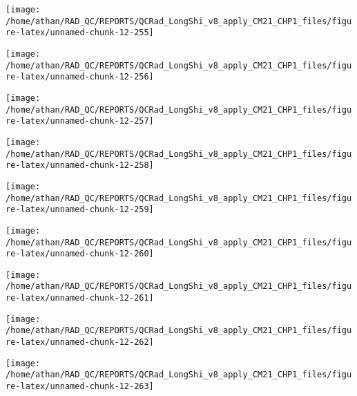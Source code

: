 \documentclass[
  10pt,
  a4paper,oneside]{article}
\begin{document}
\begin{center}\texttt{[image: /home/athan/RAD\_QC/REPORTS/QCRad\_LongShi\_v8\_apply\_CM21\_CHP1\_files/figure-latex/unnamed-chunk-12-255]} \end{center}

\begin{center}\texttt{[image: /home/athan/RAD\_QC/REPORTS/QCRad\_LongShi\_v8\_apply\_CM21\_CHP1\_files/figure-latex/unnamed-chunk-12-256]} \end{center}

\begin{center}\texttt{[image: /home/athan/RAD\_QC/REPORTS/QCRad\_LongShi\_v8\_apply\_CM21\_CHP1\_files/figure-latex/unnamed-chunk-12-257]} \end{center}

\begin{center}\texttt{[image: /home/athan/RAD\_QC/REPORTS/QCRad\_LongShi\_v8\_apply\_CM21\_CHP1\_files/figure-latex/unnamed-chunk-12-258]} \end{center}

\begin{center}\texttt{[image: /home/athan/RAD\_QC/REPORTS/QCRad\_LongShi\_v8\_apply\_CM21\_CHP1\_files/figure-latex/unnamed-chunk-12-259]} \end{center}

\begin{center}\texttt{[image: /home/athan/RAD\_QC/REPORTS/QCRad\_LongShi\_v8\_apply\_CM21\_CHP1\_files/figure-latex/unnamed-chunk-12-260]} \end{center}

\begin{center}\texttt{[image: /home/athan/RAD\_QC/REPORTS/QCRad\_LongShi\_v8\_apply\_CM21\_CHP1\_files/figure-latex/unnamed-chunk-12-261]} \end{center}

\begin{center}\texttt{[image: /home/athan/RAD\_QC/REPORTS/QCRad\_LongShi\_v8\_apply\_CM21\_CHP1\_files/figure-latex/unnamed-chunk-12-262]} \end{center}

\begin{center}\texttt{[image: /home/athan/RAD\_QC/REPORTS/QCRad\_LongShi\_v8\_apply\_CM21\_CHP1\_files/figure-latex/unnamed-chunk-12-263]} \end{center}
\end{document}
